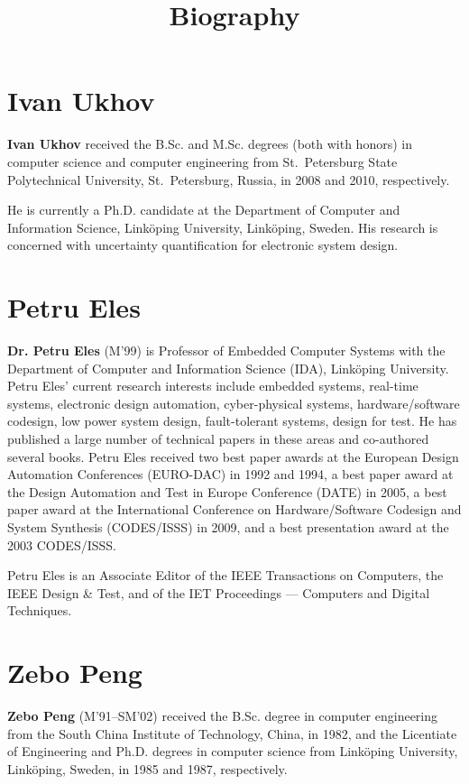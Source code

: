 \documentclass[conference]{IEEEtran}
\title{Biography}
\author{}
\begin{document}
  \maketitle

  \section*{Ivan Ukhov}
  {\bf Ivan Ukhov} received the B.Sc. and M.Sc. degrees (both with honors) in computer science and computer engineering from St.~Petersburg State Polytechnical University, St.~Petersburg, Russia, in 2008 and 2010, respectively.

  He is currently a Ph.D. candidate at the Department of Computer and Information Science, Link\"{o}ping University, Link\"{o}ping, Sweden.
  His research is concerned with uncertainty quantification for electronic system design.

  \section*{Petru Eles}
  {\bf Dr. Petru Eles} (M'99) is Professor of Embedded Computer Systems with the Department of Computer and Information Science (IDA), Link\"{o}ping University.
  Petru Eles' current research interests include embedded systems, real-time systems, electronic design automation, cyber-physical systems, hardware/software codesign, low power system design, fault-tolerant systems, design for test.
  He has published a large number of technical papers in these areas and co-authored several books.
  Petru Eles received two best paper awards at the European Design Automation Conferences (EURO-DAC) in 1992 and 1994, a best paper award at the Design Automation and Test in Europe Conference (DATE) in 2005, a best paper award at the International Conference on Hardware/Software Codesign and System Synthesis (CODES/ISSS) in 2009, and a best presentation award at the 2003 CODES/ISSS.

  Petru Eles is an Associate Editor of the IEEE Transactions on Computers, the IEEE Design \& Test, and of the IET Proceedings --- Computers and Digital Techniques.

  \section*{Zebo Peng}
  {\bf Zebo Peng} (M'91--SM'02) received the B.Sc. degree in computer engineering from the South China Institute of Technology, China, in 1982, and the Licentiate of Engineering and Ph.D. degrees in computer science from Link\"{o}ping University, Link\"{o}ping, Sweden, in 1985 and 1987, respectively.
\end{document}
